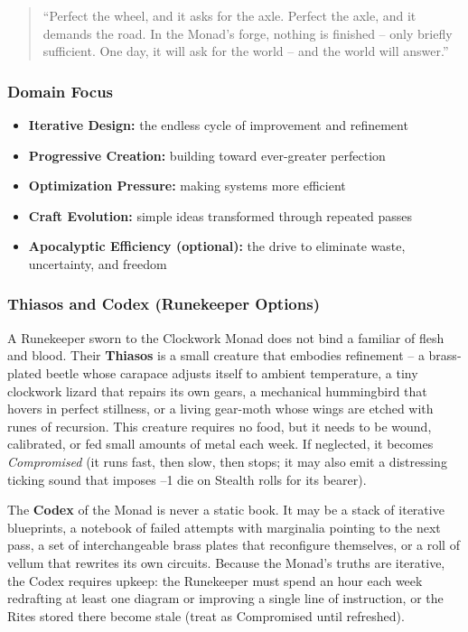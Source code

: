 \begin{quote}
``Perfect the wheel, and it asks for the axle. Perfect the axle, and it demands the road. In the Monad's forge, nothing is finished -- only briefly sufficient. One day, it will ask for the world -- and the world will answer.''
\end{quote}

\subsubsection*{Domain Focus}
\begin{itemize}
  \item \textbf{Iterative Design:} the endless cycle of improvement and refinement
  \item \textbf{Progressive Creation:} building toward ever-greater perfection
  \item \textbf{Optimization Pressure:} making systems more efficient
  \item \textbf{Craft Evolution:} simple ideas transformed through repeated passes
  \item \textbf{Apocalyptic Efficiency (optional):} the drive to eliminate waste, uncertainty, and freedom
\end{itemize}

\subsubsection*{Thiasos and Codex (Runekeeper Options)}

A Runekeeper sworn to the Clockwork Monad does not bind a familiar of flesh and blood. Their \textbf{Thiasos} is a small creature that embodies refinement -- a brass-plated beetle whose carapace adjusts itself to ambient temperature, a tiny clockwork lizard that repairs its own gears, a mechanical hummingbird that hovers in perfect stillness, or a living gear-moth whose wings are etched with runes of recursion. This creature requires no food, but it needs to be wound, calibrated, or fed small amounts of metal each week. If neglected, it becomes \textit{Compromised} (it runs fast, then slow, then stops; it may also emit a distressing ticking sound that imposes --1 die on Stealth rolls for its bearer).

The \textbf{Codex} of the Monad is never a static book. It may be a stack of iterative blueprints, a notebook of failed attempts with marginalia pointing to the next pass, a set of interchangeable brass plates that reconfigure themselves, or a roll of vellum that rewrites its own circuits. Because the Monad's truths are iterative, the Codex requires upkeep: the Runekeeper must spend an hour each week redrafting at least one diagram or improving a single line of instruction, or the Rites stored there become stale (treat as Compromised until refreshed).

